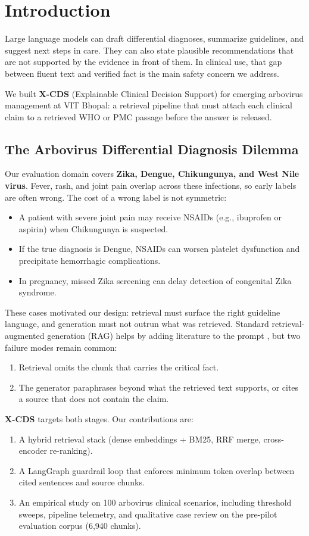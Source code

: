 \section{Introduction}\label{sec:intro}

Large language models can draft differential diagnoses, summarize guidelines, and suggest next steps in care. They can also state plausible recommendations that are not supported by the evidence in front of them. In clinical use, that gap between fluent text and verified fact is the main safety concern we address.

We built \textbf{X-CDS} (Explainable Clinical Decision Support) for emerging arbovirus management at VIT Bhopal: a retrieval pipeline that must attach each clinical claim to a retrieved WHO or PMC passage before the answer is released.

\subsection{The Arbovirus Differential Diagnosis Dilemma}
Our evaluation domain covers \textbf{Zika, Dengue, Chikungunya, and West Nile virus}. Fever, rash, and joint pain overlap across these infections, so early labels are often wrong. The cost of a wrong label is not symmetric:
\begin{itemize}
    \item A patient with severe joint pain may receive NSAIDs (e.g., ibuprofen or aspirin) when Chikungunya is suspected.
    \item If the true diagnosis is Dengue, NSAIDs can worsen platelet dysfunction and precipitate hemorrhagic complications.
    \item In pregnancy, missed Zika screening can delay detection of congenital Zika syndrome.
\end{itemize}

These cases motivated our design: retrieval must surface the right guideline language, and generation must not outrun what was retrieved. Standard retrieval-augmented generation (RAG) helps by adding literature to the prompt \citep{lewis2020retrieval}, but two failure modes remain common:
\begin{enumerate}
    \item Retrieval omits the chunk that carries the critical fact.
    \item The generator paraphrases beyond what the retrieved text supports, or cites a source that does not contain the claim.
\end{enumerate}

\textbf{X-CDS} targets both stages. Our contributions are:
\begin{enumerate}
    \item A hybrid retrieval stack (dense embeddings + BM25, RRF merge, cross-encoder re-ranking).
    \item A LangGraph guardrail loop that enforces minimum token overlap between cited sentences and source chunks.
    \item An empirical study on 100 arbovirus clinical scenarios, including threshold sweeps, pipeline telemetry, and qualitative case review on the pre-pilot evaluation corpus (6,940 chunks).
\end{enumerate}
